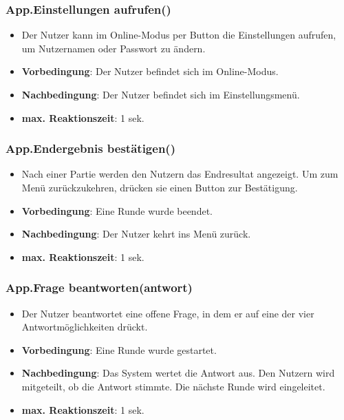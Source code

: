 \documentclass[fontsize=12pt,paper=a4,twoside]{scrartcl}
\begin{document}
\subsubsection{App.Einstellungen aufrufen()}
\begin{itemize}
\item Der Nutzer kann im Online-Modus per Button die Einstellungen aufrufen, um Nutzernamen oder Passwort zu ändern.
\item \textbf{Vorbedingung}: Der Nutzer befindet sich im Online-Modus.
\item \textbf{Nachbedingung}: Der Nutzer befindet sich im Einstellungsmenü. 
\item \textbf{max. Reaktionszeit}: 1 sek.
\end{itemize}

\subsubsection{App.Endergebnis bestätigen()}
\begin{itemize}
\item Nach einer Partie werden den Nutzern das Endresultat angezeigt. Um zum Menü zurückzukehren, drücken sie einen Button zur Bestätigung.
\item \textbf{Vorbedingung}: Eine Runde wurde beendet.
\item \textbf{Nachbedingung}: Der Nutzer kehrt ins Menü zurück. 
\item \textbf{max. Reaktionszeit}: 1 sek.
\end{itemize}

\subsubsection{App.Frage beantworten(antwort)}
\begin{itemize}
\item Der Nutzer beantwortet eine offene Frage, in dem er auf eine der vier Antwortmöglichkeiten drückt.
\item \textbf{Vorbedingung}: Eine Runde wurde gestartet.
\item \textbf{Nachbedingung}: Das System wertet die Antwort aus. Den Nutzern wird mitgeteilt, ob die Antwort stimmte. Die nächste Runde wird eingeleitet.
\item \textbf{max. Reaktionszeit}: 1 sek.
\end{itemize}
\end{document}
